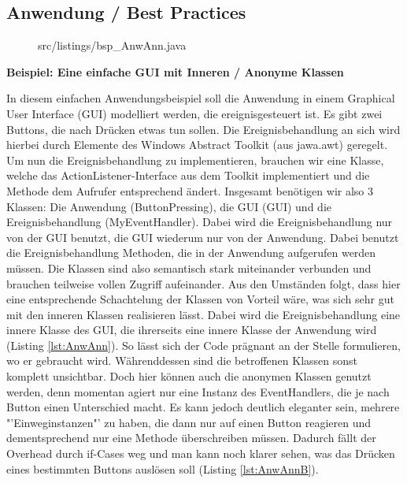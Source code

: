 \newpage
\subsection{Anwendung / Best Practices}


\begin{figure}[H]
\lstset{language=Java}
 {src/listings/bsp_AnwAnn.java}
\end{figure}


{\bf Beispiel: Eine einfache GUI mit Inneren / Anonyme Klassen}

In diesem einfachen Anwendungsbeispiel soll die Anwendung in einem Graphical User Interface (GUI) modelliert werden, die ereignisgesteuert ist.
Es gibt zwei Buttons, die nach Drücken etwas tun sollen.
Die Ereignisbehandlung an sich wird hierbei durch Elemente des Windows Abstract Toolkit (aus jawa.awt) geregelt.
Um nun die Ereignisbehandlung zu implementieren, brauchen wir eine Klasse, welche das ActionListener-Interface aus dem Toolkit implementiert und die Methode dem Aufrufer entsprechend ändert.
Insgesamt benötigen wir also 3 Klassen: Die Anwendung (ButtonPressing), die GUI (GUI) und die Ereignisbehandlung (MyEventHandler). Dabei wird die Ereignisbehandlung nur von der GUI benutzt, die GUI wiederum nur von der Anwendung. Dabei benutzt die Ereignisbehandlung Methoden, die in der Anwendung aufgerufen werden müssen.
Die Klassen sind also semantisch stark miteinander verbunden und brauchen teilweise vollen Zugriff aufeinander.
Aus den Umständen folgt, dass hier eine entsprechende Schachtelung der Klassen von Vorteil wäre, was sich sehr gut mit den inneren Klassen realisieren lässt.
Dabei wird die Ereignisbehandlung eine innere Klasse des GUI, die ihrerseits eine innere Klasse der Anwendung wird (Listing \ref{lst:AnwAnn}).
So lässt sich der Code prägnant an der Stelle formulieren, wo er gebraucht wird.
Währenddessen sind die betroffenen Klassen sonst komplett unsichtbar.
Doch hier können auch die anonymen Klassen genutzt werden, denn momentan agiert nur eine Instanz des EventHandlers, die je nach Button einen Unterschied macht. Es kann jedoch deutlich eleganter sein, mehrere "'Einweginstanzen"' zu haben, die dann nur auf einen Button reagieren und dementsprechend nur eine Methode überschreiben müssen.
Dadurch fällt der Overhead durch if-Cases weg und man kann noch klarer sehen, was das Drücken eines bestimmten Buttons auslösen soll (Listing \ref{lst:AnwAnnB}).

